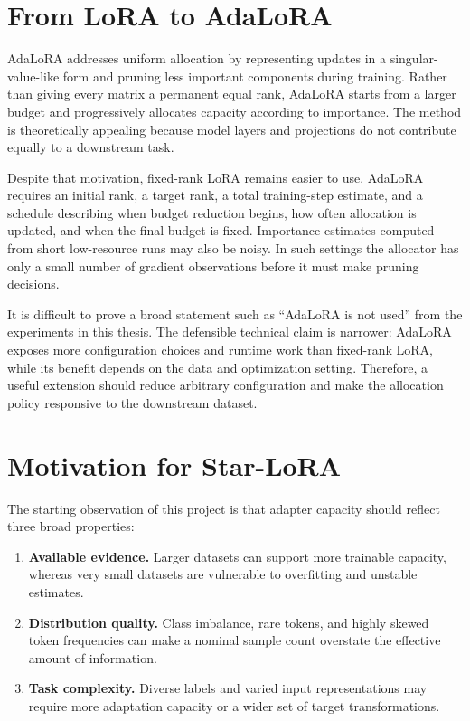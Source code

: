 \section{From LoRA to AdaLoRA}

AdaLoRA \citep{zhang2023adalora} addresses uniform allocation by representing updates in a
singular-value-like form and pruning less important components during training. Rather than giving
every matrix a permanent equal rank, AdaLoRA starts from a larger budget and progressively
allocates capacity according to importance. The method is theoretically appealing because model
layers and projections do not contribute equally to a downstream task.

Despite that motivation, fixed-rank LoRA remains easier to use. AdaLoRA requires an initial rank,
a target rank, a total training-step estimate, and a schedule describing when budget reduction
begins, how often allocation is updated, and when the final budget is fixed. Importance estimates
computed from short low-resource runs may also be noisy. In such settings the allocator has only a
small number of gradient observations before it must make pruning decisions.

It is difficult to prove a broad statement such as ``AdaLoRA is not used'' from the experiments in
this thesis. The defensible technical claim is narrower: AdaLoRA exposes more configuration choices
and runtime work than fixed-rank LoRA, while its benefit depends on the data and optimization
setting. Therefore, a useful extension should reduce arbitrary configuration and make the
allocation policy responsive to the downstream dataset.

\section{Motivation for Star-LoRA}

The starting observation of this project is that adapter capacity should reflect three broad
properties:
\begin{enumerate}[label=(\arabic*)]
  \item \textbf{Available evidence.} Larger datasets can support more trainable capacity, whereas
  very small datasets are vulnerable to overfitting and unstable estimates.
  \item \textbf{Distribution quality.} Class imbalance, rare tokens, and highly skewed token
  frequencies can make a nominal sample count overstate the effective amount of information.
  \item \textbf{Task complexity.} Diverse labels and varied input representations may require more
  adaptation capacity or a wider set of target transformations.
\end{enumerate}

